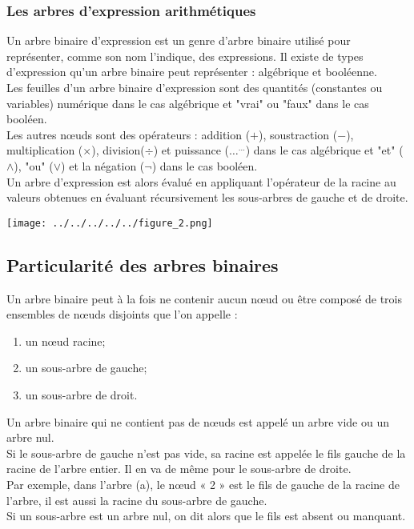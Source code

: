 \documentclass{report}
\begin{document}
\subsubsection{Les arbres d'expression arithmétiques}

Un arbre binaire d'expression est un genre d'arbre binaire utilisé pour représenter, comme son nom l'indique, des expressions. Il existe de types d'expression qu'un arbre binaire peut représenter : algébrique et booléenne.  \\ 
Les feuilles d'un arbre binaire d'expression sont des quantités (constantes ou variables) numérique dans le cas algébrique et "vrai" ou "faux" dans le cas booléen.\\
Les autres nœuds sont des opérateurs : addition ($+$), soustraction ($-$), multiplication ($\times$), division($\div$) et puissance ($\ldots^{\ldots}$) dans le cas algébrique et "et" ($\wedge$), "ou" ($\vee$) et la négation ($\neg$) dans le cas booléen.\\
Un arbre d'expression est alors évalué en appliquant l'opérateur de la racine au valeurs obtenues en évaluant récursivement les sous-arbres de gauche et de droite.

\begin{center}
	\texttt{[image: ../../../../../figure\_2.png]} 
\end{center}


  
\subsection{Particularité des arbres binaires}

Un arbre binaire peut à la fois ne contenir aucun nœud ou être composé de trois ensembles de nœuds disjoints que l'on appelle :
\begin{enumerate}
\item un nœud racine;
\item un sous-arbre de gauche;
\item un sous-arbre de droit.
\end{enumerate}

Un arbre binaire qui ne contient pas de nœuds est appelé un arbre vide ou un arbre nul.\\
Si le sous-arbre de gauche n'est pas vide, sa racine est appelée le fils gauche de la racine de l'arbre entier. Il en va de même pour le sous-arbre de droite.\\
Par exemple, dans l'arbre (a), le nœud « 2 » est le fils de gauche de la racine de l'arbre, il est aussi la racine du sous-arbre de gauche.\\
Si un sous-arbre est un arbre nul, on dit alors que le fils est absent ou manquant.\\
\end{document}
